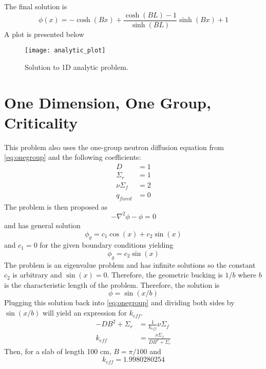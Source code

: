   The final solution is 
  \begin{equation} \label{eq:one_dimension}
    \phi(x) = -\cosh(Bx) + \frac{\cosh(BL)-1}{\sinh(BL)} \sinh(Bx) +1
  \end{equation}
  A plot is presented below
  \begin{figure}[H] 
    \centering
    \texttt{[image: analytic\_plot]}
    \caption{Solution to 1D analytic problem.}
    \label{fg:analytic_plot}
  \end{figure}
  
\section{One Dimension, One Group, Criticality} \label{sc:onegroup1d}
  This problem also uses the one-group neutron diffusion equation from 
  \eqref{eq:onegroup} and the following coefficients:
  \begin{align*}
    D &= 1\\
    \Sigma_r &= 1\\
    \nu \Sigma_f &= 2\\
    q_{fixed} &= 0
  \end{align*}
  The problem is then proposed as 
  \begin{equation}
    -\nabla^2 \phi - \phi = 0 
  \end{equation}
  and has general solution
  \begin{equation}
    \phi_g = c_1 \cos(x) + c_2 \sin(x)
  \end{equation}
  and $c_1 = 0 $ for the given boundary conditions yielding
  \begin{equation} \label{eq:sinshape}
    \phi_g = c_2 \sin(x)
  \end{equation}
  The problem is an eigenvalue problem and has infinite solutions so the 
  constant $c_2$ is arbitrary and $\sin(x)=0$. Therefore, the geometric 
  bucking is $1/b$ where $b$ is the characteristic length of the problem. 
  Therefore, the solution is 
  \begin{equation} \label{eq:onedimensionsol}
    \phi = \sin(x/b)
  \end{equation}
  Plugging this solution back into \eqref{eq:onegroup} and dividing both sides
  by $\sin(x/b)$ will yield an expression for $k_{eff}$.
  \begin{align}
    -D B^2 + \Sigma_r &= \frac{1}{k_{eff}} \nu \Sigma_f \\
    k_{eff} &= \frac{\nu \Sigma_f}{DB^2 + \Sigma_r} \label{eq:keff1d}
  \end{align}
  Then, for a slab of length 100 cm, $B = \pi / 100$ and
  \[ k_{eff} = 1.9980280254 \]
